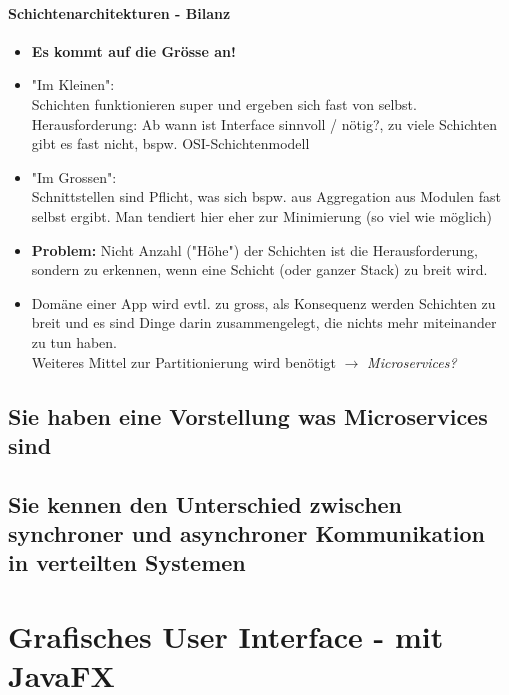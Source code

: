 \documentclass[a4paper]{article}
\begin{document}
			\paragraph{Schichtenarchitekturen - Bilanz}
			
			\begin{itemize}
				\item \textbf{Es kommt auf die Grösse an!}
				\item "Im Kleinen":\\
				Schichten funktionieren super und ergeben sich fast von selbst.\\
				Herausforderung: Ab wann ist Interface sinnvoll / nötig?, zu viele Schichten gibt es fast nicht, bspw. OSI-Schichtenmodell
				\item "Im Grossen":\\
				Schnittstellen sind Pflicht, was sich bspw. aus Aggregation aus Modulen fast selbst ergibt. Man tendiert hier eher zur Minimierung (so viel wie möglich)
				\item \textbf{Problem:} Nicht Anzahl ("Höhe") der Schichten ist die Herausforderung, sondern zu erkennen, wenn eine Schicht (oder ganzer Stack) zu breit wird.
				\item Domäne einer App wird evtl. zu gross, als Konsequenz werden Schichten zu breit und es sind Dinge darin zusammengelegt, die nichts mehr miteinander zu tun haben.\\
				Weiteres Mittel zur Partitionierung wird benötigt $\rightarrow$ \textit{Microservices?}
			\end{itemize}
		
		
		\subsection{Sie haben eine Vorstellung was Microservices sind}
		
		
		
		
		\subsection{Sie kennen den Unterschied zwischen synchroner und asynchroner Kommunikation in verteilten Systemen}
		
	\newpage
	\section{Grafisches User Interface - mit JavaFX}	
		
		
\end{document}
